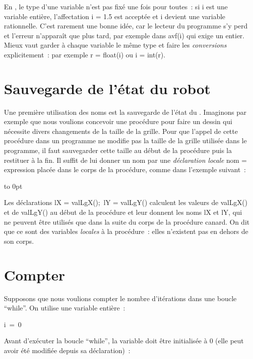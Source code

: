 \noindent  En \python, le type d'une variable n'est pas fixé une fois pour toutes~:
si {\idt i} est une variable entière, l'affectation {\idt i = 1.5} est
acceptée et {\idt i} devient une variable rationnelle. C'est rarement une bonne idée, car le
lecteur du programme s'y perd et l'erreur n'apparaît que plus tard, par exemple dans
{\idt avf(i)} qui exige un entier. Mieux vaut garder à chaque variable le même type et faire les
{\em conversions} explicitement~: par exemple
{\idt r = float(i)} ou {\idt i = int(r)}.

\section{Sauvegarde de l'état du robot}

Une première utilisation des noms est la sauvegarde de l'état du \robot. Imaginons par
exemple que nous voulions concevoir une procédure pour faire un dessin qui nécessite divers
changements de la taille de la grille. Pour que l'appel de
cette procédure dans un programme ne modifie pas la taille de la grille utilisée dans le
programme, il faut sauvegarder cette
taille au début de la procédure puis la restituer à la fin. Il suffit de lui donner un
nom par une {\em déclaration locale}
{\idt nom = expression} placée dans le corps de la procédure, comme dans l'exemple suivant~:

{\raggedright
 \vbox to 0pt{}%
 
 }

\noindent Les déclarations {\idt lX = valLgX();\ lY = valLgY()}
calculent les valeurs de {\idt valLgX()} et de {\idt valLgY()} au début de la procédure et
leur donnent les noms {\idt lX} et {\idt lY}, qui ne peuvent être utilisés que dans la suite du
corps de la procédure {\idt canard}. On dit que ce sont des variables {\em locales} à la
procédure~: elles n'existent pas en dehors de son corps.

\section{Compter}
Supposons que nous voulions
compter le nombre d'itérations dans une boucle ``while''. On utilise une variable entière~:

\mbox{\blc  \blk\idt  i\ =\ 0}\par

\noindent Avant d'exécuter la boucle ``while'', la variable doit être initialisée à 0
(elle peut avoir été modifiée depuis sa déclaration)~:

